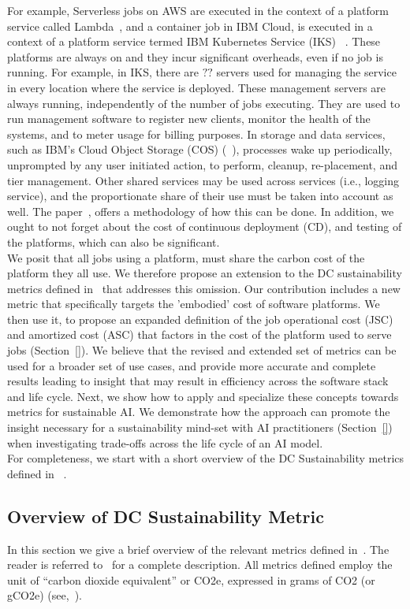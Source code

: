 For example, Serverless jobs on AWS are executed in the context of a platform service called Lambda~\cite{}, and a container job in IBM Cloud, is executed in a context of a platform service termed IBM Kubernetes Service (IKS) ~\cite{}. These platforms are always on and they incur significant overheads, even if no job is running. For example, in IKS, there are $??$ servers used for managing the service in every location where the service is deployed. These management servers are always running, independently of the number of jobs executing. They are used
to run management software to 
register new clients, monitor the health of the systems, and to meter usage for billing purposes.
In storage and data services, such as IBM's Cloud Object Storage (COS) (~\cite{}), processes wake up periodically, unprompted by any user initiated action, to perform, cleanup, re-placement, and tier management. Other shared services may be used across
services (i.e., logging service),
and the proportionate share of their use must be taken into account as well. The paper~\cite{eilam22}, 
offers a methodology of how this can be done. 
In addition, we ought to not forget about the cost of continuous deployment (CD), and testing of the platforms, which can also be significant.
\\
We posit that all jobs using a platform, must share the carbon cost of the platform they all use. We therefore propose an extension to the DC sustainability metrics defined in~\cite{gandhi2022metrics} that addresses this omission. Our contribution includes  
a new metric that specifically targets the 'embodied' cost of software platforms. 
We then use it, to propose
an expanded definition of the job operational cost (JSC) and amortized cost (ASC) that factors in the cost of the platform used to serve jobs (Section~\ref{}).
We believe that the revised and extended set of metrics can be used
for a broader set of use cases, and 
provide more accurate and complete results leading to insight that may result in efficiency 
across the software stack and life cycle. Next, we show how to apply and specialize these 
concepts towards metrics for sustainable AI. We demonstrate how the 
approach can promote the insight necessary for a
sustainability mind-set with AI practitioners (Section~\ref{}) when 
investigating trade-offs across the life cycle of an AI model. 
\\
For completeness, we start with a short overview of the DC Sustainability 
metrics defined in ~\cite{}. 
\subsection{Overview of DC Sustainability Metric}
\label{overview}
In this section we give a brief overview of the relevant metrics defined in~\cite{gandhi2022metrics}. 
The reader is referred to~\cite{gandhi2022metrics} for a complete description.
All metrics defined employ the unit of “carbon dioxide equivalent” or CO2e, expressed in grams of CO2 (or gCO2e) (see,~\cite{}). 

